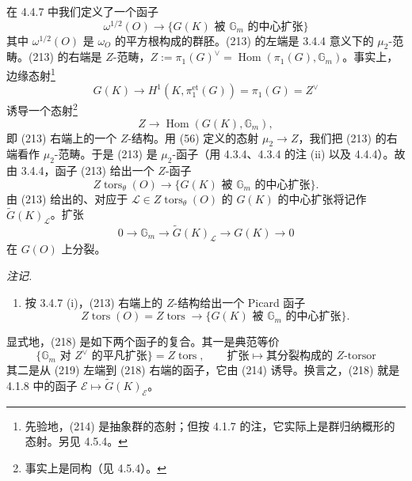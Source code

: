  在 4.4.7 中我们定义了一个函子
\begin{equation}\tag{213}
\omega^{1/2}(O)\to\{G(K)\text{ 被 }\mathbb{G}_{m}\text{ 的中心扩张}\}
\end{equation}
其中 $\omega^{1/2}(O)$ 是 $\omega_{O}$ 的平方根构成的群胚。(213) 的左端是 3.4.4 意义下的 $\mu_{2}$-范畴。(213) 的右端是 $Z$-范畴，$Z:=\pi_{1}(G)^{\vee}=\operatorname{Hom}(\pi_{1}(G),\mathbb{G}_{m})$。事实上，边缘态射\footnote{先验地，(214) 是抽象群的态射；但按 4.1.7 的注，它实际上是群归纳概形的态射。另见 4.5.4。}
\begin{equation}\tag{214}
G(K)\to H^{1}(K,\pi_{1}^{\mathrm{et}}(G))=\pi_{1}(G)=Z^{\vee}
\end{equation}
诱导一个态射\footnote{事实上是同构（见 4.5.4）。}
\begin{equation}\tag{215}
Z\to\operatorname{Hom}(G(K),\mathbb{G}_{m}),
\end{equation}
即 (213) 右端上的一个 $Z$-结构。用 (56) 定义的态射 $\mu_{2}\to Z$，我们把 (213) 的右端看作 $\mu_{2}$-范畴。于是 (213) 是 $\mu_{2}$-函子（用 4.3.4、4.3.4 的注 (ii) 以及 4.4.4）。故由 3.4.4，函子 (213) 给出一个 $Z$-函子
\begin{equation}\tag{216}
Z\operatorname{tors}_{\theta}(O)\to\{G(K)\text{ 被 }\mathbb{G}_{m}\text{ 的中心扩张}\}.
\end{equation}
由 (213) 给出的、对应于 $\mathcal{L}\in Z\operatorname{tors}_{\theta}(O)$ 的 $G(K)$ 的中心扩张将记作 $\tilde{G}(K)_{\mathcal{L}}$。扩张
\begin{equation}\tag{217}
0\to\mathbb{G}_{m}\to\tilde{G}(K)_{\mathcal{L}}\to G(K)\to 0
\end{equation}
在 $G(O)$ 上分裂。

\emph{注记.}
\begin{enumerate}[label=(\roman*),leftmargin=2.2em]
\item 按 3.4.7 (i)，(213) 右端上的 $Z$-结构给出一个 Picard 函子
\begin{equation}\tag{218}
Z\operatorname{tors}(O)=Z\operatorname{tors}\to\{G(K)\text{ 被 }\mathbb{G}_{m}\text{ 的中心扩张}\}.
\end{equation}
\end{enumerate}


显式地，(218) 是如下两个函子的复合。其一是典范等价
\begin{equation}\tag{219}
\{\mathbb{G}_{m}\text{ 对 }Z^{\vee}\text{ 的平凡扩张}\}=Z\operatorname{tors},\qquad
\text{扩张}\mapsto\text{其分裂构成的 }Z\text{-torsor}
\end{equation}
其二是从 (219) 左端到 (218) 右端的函子，它由 (214) 诱导。换言之，(218) 就是 4.1.8 中的函子 $\mathcal{E}\mapsto\tilde{G}(K)_{\mathcal{E}}$。

